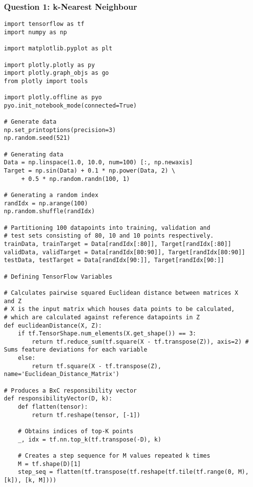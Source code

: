 \documentclass[a4paper,12pt]{article}
\begin{document}
\subsubsection{Question 1: k-Nearest Neighbour}
\begin{verbatim}
import tensorflow as tf
import numpy as np

import matplotlib.pyplot as plt

import plotly.plotly as py
import plotly.graph_objs as go
from plotly import tools

import plotly.offline as pyo
pyo.init_notebook_mode(connected=True)

# Generate data
np.set_printoptions(precision=3)
np.random.seed(521)

# Generating data
Data = np.linspace(1.0, 10.0, num=100) [:, np.newaxis]
Target = np.sin(Data) + 0.1 * np.power(Data, 2) \
     + 0.5 * np.random.randn(100, 1)
    
# Generating a random index
randIdx = np.arange(100)
np.random.shuffle(randIdx)

# Partitioning 100 datapoints into training, validation and 
# test sets consisting of 80, 10 and 10 points respectively.
trainData, trainTarget = Data[randIdx[:80]], Target[randIdx[:80]]
validData, validTarget = Data[randIdx[80:90]], Target[randIdx[80:90]]
testData, testTarget = Data[randIdx[90:]], Target[randIdx[90:]]

# Defining TensorFlow Variables

# Calculates pairwise squared Euclidean distance between matrices X and Z
# X is the input matrix which houses data points to be calculated, 
# which are calculated against reference datapoints in Z
def euclideanDistance(X, Z):
    if tf.TensorShape.num_elements(X.get_shape()) == 3:
        return tf.reduce_sum(tf.square(X - tf.transpose(Z)), axis=2) # Sums feature deviations for each variable
    else:
        return tf.square(X - tf.transpose(Z), name='Euclidean_Distance_Matrix')

# Produces a BxC responsibility vector
def responsibilityVector(D, k):
    def flatten(tensor):
        return tf.reshape(tensor, [-1])
    
    # Obtains indices of top-K points
    _, idx = tf.nn.top_k(tf.transpose(-D), k)
    
    # Creates a step sequence for M values repeated k times
    M = tf.shape(D)[1]
    step_seq = flatten(tf.transpose(tf.reshape(tf.tile(tf.range(0, M), [k]), [k, M])))
    

\end{verbatim}
\end{document}
